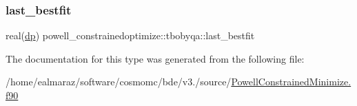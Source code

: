 \mbox{\label{structpowell__constrainedoptimize_1_1tbobyqa_ace01b7bae8ebc72f66cd27816f7816a6}} 
\subsubsection{\texorpdfstring{last\+\_\+bestfit}{last\_bestfit}}
{\footnotesize\ttfamily real(\mbox{\hyperlink{namespacepowell__constrainedoptimize_a8a0275c8eca26a533d0e5d9aef7b9eaa}{dp}}) powell\+\_\+constrainedoptimize\+::tbobyqa\+::last\+\_\+bestfit\hspace{0.3cm}{\ttfamily [private]}}



The documentation for this type was generated from the following file\+:\begin{DoxyCompactItemize}
\item 
/home/ealmaraz/software/cosmomc/bde/v3./source/\mbox{\hyperlink{PowellConstrainedMinimize_8f90}{Powell\+Constrained\+Minimize.\+f90}}\end{DoxyCompactItemize}
